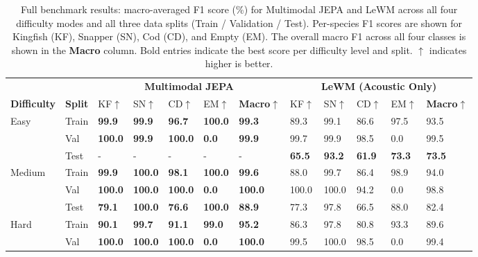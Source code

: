 \begin{table}[t]
\centering
\caption{%
  Full benchmark results: macro-averaged F1 score (\%) for Multimodal JEPA and LeWM across all four
  difficulty modes and all three data splits (Train / Validation / Test).
  Per-species F1 scores are shown for Kingfish (KF), Snapper (SN), Cod (CD), and Empty (EM).
  The overall macro F1 across all four classes is shown in the \textbf{Macro} column.
  Bold entries indicate the best score per difficulty level and split.
  $\uparrow$ indicates higher is better.
}
\label{tab:full_results}
\setlength{\tabcolsep}{4.5pt}
\small
\begin{tabular}{@{}ll lllll lllll@{}}
\toprule
& & \multicolumn{5}{c}{\textbf{Multimodal JEPA} \cite{assran2023self}} 
  & \multicolumn{5}{c}{\textbf{LeWM (Acoustic Only)} \cite{lecun2026le}} \\
\cmidrule(lr){3-7} \cmidrule(lr){8-12}
\textbf{Difficulty} & \textbf{Split} 
  & KF$\uparrow$ & SN$\uparrow$ & CD$\uparrow$ & EM$\uparrow$ & \textbf{Macro}$\uparrow$
  & KF$\uparrow$ & SN$\uparrow$ & CD$\uparrow$ & EM$\uparrow$ & \textbf{Macro}$\uparrow$ \\
\midrule
\multirow{3}{*}{Easy}
  & Train & \textbf{99.9} & \textbf{99.9} & \textbf{96.7} & \textbf{100.0} & \textbf{99.3} & 89.3 & 99.1 & 86.6 & 97.5 & 93.5 \\
  & Val & \textbf{100.0} & \textbf{99.9} & \textbf{100.0} & \textbf{0.0} & \textbf{99.9} & 99.7 & 99.9 & 98.5 & 0.0 & 99.5 \\
  & Test & - & - & - & - & - & \textbf{65.5} & \textbf{93.2} & \textbf{61.9} & \textbf{73.3} & \textbf{73.5} \\
\midrule
\multirow{3}{*}{Medium}
  & Train & \textbf{99.9} & \textbf{100.0} & \textbf{98.1} & \textbf{100.0} & \textbf{99.6} & 88.0 & 99.7 & 86.4 & 98.9 & 94.0 \\
  & Val & \textbf{100.0} & \textbf{100.0} & \textbf{100.0} & \textbf{0.0} & \textbf{100.0} & 100.0 & 100.0 & 94.2 & 0.0 & 98.8 \\
  & Test & \textbf{79.1} & \textbf{100.0} & \textbf{76.6} & \textbf{100.0} & \textbf{88.9} & 77.3 & 97.8 & 66.5 & 88.0 & 82.4 \\
\midrule
\multirow{3}{*}{Hard}
  & Train & \textbf{90.1} & \textbf{99.7} & \textbf{91.1} & \textbf{99.0} & \textbf{95.2} & 86.3 & 97.8 & 80.8 & 93.3 & 89.6 \\
  & Val & \textbf{100.0} & \textbf{100.0} & \textbf{100.0} & \textbf{0.0} & \textbf{100.0} & 99.5 & 100.0 & 98.5 & 0.0 & 99.4 \\

\end{tabular}
\end{table}
